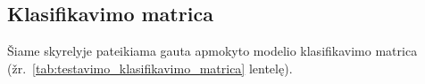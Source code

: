 \subsection{Klasifikavimo matrica}
\label{subsec:testavimo_klasifikavimo_matrica}

Šiame skyrelyje pateikiama gauta apmokyto modelio klasifikavimo matrica (žr.~\ref{tab:testavimo_klasifikavimo_matrica} lentelę).

